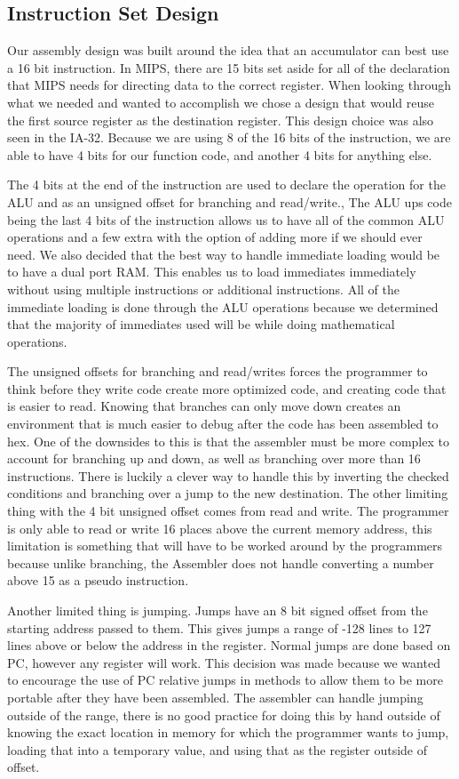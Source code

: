 \documentclass{report}
\begin{document}
		\subsection{Instruction Set Design}
			Our assembly design was built around the idea that an accumulator can best use a 16 bit instruction.  In MIPS, there are 15 bits set aside for all of the declaration that MIPS needs for directing data to the correct register. When looking through what we needed and wanted to accomplish we chose a design that would reuse the first source register as the destination register. This design choice was also seen in the IA-32. Because we are using 8 of the 16 bits of the instruction, we are able to have 4 bits for our function code, and another 4 bits for anything else.\par
			The 4 bits at the end of the instruction are used to declare the operation for the ALU and as an unsigned offset for branching and read/write., The ALU ups code being the last 4 bits of the instruction allows us to have all of the common ALU operations and a few extra with the option of adding more if we should ever need. We also decided that the best way to handle immediate loading would be to have a dual port RAM. This enables us to load immediates immediately without using multiple instructions or additional instructions. All of the immediate loading is done through the ALU operations because we determined that the majority of immediates used will be while doing mathematical operations.\par
			The unsigned offsets for branching and read/writes forces the programmer to think before they write code create more optimized code, and creating code that is easier to read. Knowing that branches can only move down creates an environment that is much easier to debug after the code has been assembled to hex. One of the downsides to this is that the assembler must be more complex to account for branching up and down, as well as branching over more than 16 instructions. There is luckily a clever way to handle this by inverting the checked conditions and branching over a jump to the new destination. The other limiting thing with the 4 bit unsigned offset comes from read and write. The programmer is only able to read or write 16 places above the current memory address, this limitation is something that will have to be worked around by the programmers because unlike branching, the Assembler does not handle converting a number above 15 as a pseudo instruction.\par
			Another limited thing is jumping. Jumps have an 8 bit signed offset from the starting address passed to them. This gives jumps a range of -128 lines to 127 lines above or below the address in the register. Normal jumps are done based on PC, however any register will work. This decision was made because we wanted to encourage the use of PC relative jumps in methods to allow them to be more portable after they have been assembled. The assembler can handle jumping outside of the range, there is no good practice for doing this by hand outside of knowing the exact location in memory for which the programmer wants to jump, loading that into a temporary value, and using that as the register outside of offset.\par
\end{document}
